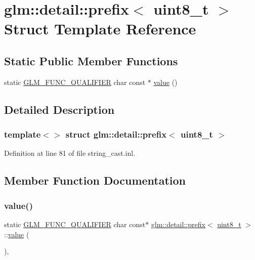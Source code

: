 \hypertarget{structglm_1_1detail_1_1prefix_3_01uint8__t_01_4}{}\section{glm\+::detail\+::prefix$<$ uint8\+\_\+t $>$ Struct Template Reference}
\label{structglm_1_1detail_1_1prefix_3_01uint8__t_01_4}
\subsection*{Static Public Member Functions}
\begin{DoxyCompactItemize}
\item 
static \mbox{\hyperlink{setup_8hpp_a33fdea6f91c5f834105f7415e2a64407}{G\+L\+M\+\_\+\+F\+U\+N\+C\+\_\+\+Q\+U\+A\+L\+I\+F\+I\+ER}} char const  $\ast$ \mbox{\hyperlink{structglm_1_1detail_1_1prefix_3_01uint8__t_01_4_a890818b4dedbe09730336c1ae3913339}{value}} ()
\end{DoxyCompactItemize}


\subsection{Detailed Description}
\subsubsection*{template$<$$>$\newline
struct glm\+::detail\+::prefix$<$ uint8\+\_\+t $>$}



Definition at line 81 of file string\+\_\+cast.\+inl.



\subsection{Member Function Documentation}
\mbox{\label{structglm_1_1detail_1_1prefix_3_01uint8__t_01_4_a890818b4dedbe09730336c1ae3913339}} 
\subsubsection{\texorpdfstring{value()}{value()}}
{\footnotesize\ttfamily static \mbox{\hyperlink{setup_8hpp_a33fdea6f91c5f834105f7415e2a64407}{G\+L\+M\+\_\+\+F\+U\+N\+C\+\_\+\+Q\+U\+A\+L\+I\+F\+I\+ER}} char const$\ast$ \mbox{\hyperlink{structglm_1_1detail_1_1prefix}{glm\+::detail\+::prefix}}$<$ \mbox{\hyperlink{group__gtc__type__precision_ga93adf6dd9803408f3e3aaf9dedda352b}{uint8\+\_\+t}} $>$\+::\mbox{\hyperlink{glad_8h_a03aff08f73d7fde3d1a08e0abd8e84fa}{value}} (\begin{DoxyParamCaption}{ }\end{DoxyParamCaption})\hspace{0.3cm}{\ttfamily [inline]}, {\ttfamily [static]}}



